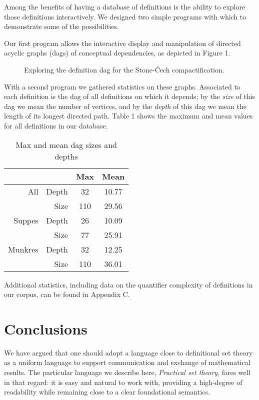 \documentclass{llncs}
\begin{document}
Among the benefits of having a database of definitions is the ability to explore those definitions interactively. We designed two simple programs with which to demonstrate some of the possibilities.

Our first program allows the interactive display and manipulation of
directed acyclic graphs (dags) of conceptual dependencies, as depicted
in Figure 1.

\begin{figure}
\begin{center}
\label{kmap_screenshot}
\caption[]{Exploring the definition dag for the Stone-\v Cech compactification.}
\end{center}
\end{figure}

With a second program we gathered statistics on these graphs.
Associated to each definition is the dag of all definitions on which
it depends; by the \emph{size} of this dag we mean the number of
vertices, and by the \emph{depth} of this dag we mean the length of
its longest directed path. Table 1 shows the maximum and mean values
for all definitions in our database.

\begin{table}
\label{dag_data}
\begin{center}
\caption{Max and mean dag sizes and depths}
\begin{tabular}{|r|r|c|c|}
\hline
& & Max & Mean \\\hline
All & Depth & 32 & 10.77 \\
  & Size & 110 & 29.56 \\\hline
Suppes & Depth & 26 & 10.09 \\
  & Size & 77 & 25.91 \\\hline
Munkres & Depth & 32 & 12.25 \\
  & Size & 110 & 36.01 \\
\hline
\end{tabular}
\end{center}
\end{table}
Additional statistics, including data on the quantifier complexity of
definitions in our corpus, can be found in Appendix C. 

\section{Conclusions}

We have argued that one should adopt a language close to definitional
set theory as a uniform language to support communication and exchange
of mathematical results. The particular language we describe here,
\emph{Practical set theory}, fares well in that regard: it
is easy and natural to work with, providing a high-degree of
readability while remaining close to a clear foundational semantics.
\end{document}
